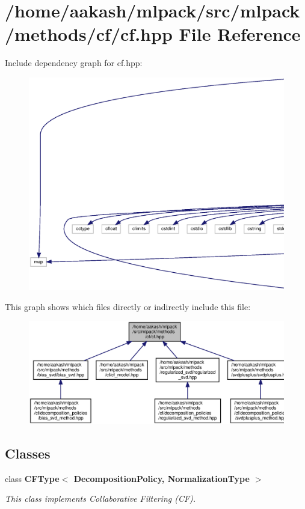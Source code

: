 \section{/home/aakash/mlpack/src/mlpack/methods/cf/cf.hpp File Reference}
\label{cf_8hpp}
Include dependency graph for cf.\+hpp\+:
\nopagebreak
\begin{figure}[H]
\begin{center}
\leavevmode
\includegraphics[width=350pt]{cf_8hpp__incl}
\end{center}
\end{figure}
This graph shows which files directly or indirectly include this file\+:
\nopagebreak
\begin{figure}[H]
\begin{center}
\leavevmode
\includegraphics[width=350pt]{cf_8hpp__dep__incl}
\end{center}
\end{figure}
\subsection*{Classes}
\begin{DoxyCompactItemize}
\item 
class \textbf{ C\+F\+Type$<$ Decomposition\+Policy, Normalization\+Type $>$}
\begin{DoxyCompactList}\small\item\em This class implements Collaborative Filtering (CF). \end{DoxyCompactList}\end{DoxyCompactItemize}
